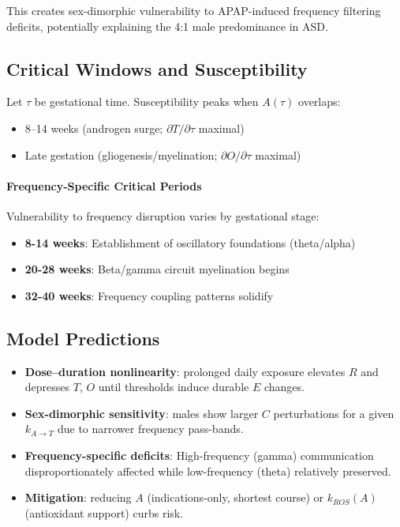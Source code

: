 \documentclass[12pt]{article}
\begin{document}
This creates sex-dimorphic vulnerability to APAP-induced frequency filtering deficits, potentially explaining the 4:1 male predominance in ASD.

\subsection{Critical Windows and Susceptibility}
Let $\tau$ be gestational time. Susceptibility peaks when $A(\tau)$ overlaps:
\begin{itemize}
\item 8--14 weeks (androgen surge; $\partial T/\partial \tau$ maximal)
\item Late gestation (gliogenesis/myelination; $\partial O/\partial \tau$ maximal)
\end{itemize}

\paragraph{Frequency-Specific Critical Periods}
Vulnerability to frequency disruption varies by gestational stage:
\begin{itemize}
\item \textbf{8-14 weeks}: Establishment of oscillatory foundations (theta/alpha)
\item \textbf{20-28 weeks}: Beta/gamma circuit myelination begins
\item \textbf{32-40 weeks}: Frequency coupling patterns solidify
\end{itemize}

\subsection{Model Predictions}
\begin{itemize}
\item \textbf{Dose--duration nonlinearity}: prolonged daily exposure elevates $R$ and depresses $T$, $O$ until thresholds induce durable $E$ changes.
\item \textbf{Sex-dimorphic sensitivity}: males show larger $C$ perturbations for a given $k_{A \rightarrow T}$ due to narrower frequency pass-bands.
\item \textbf{Frequency-specific deficits}: High-frequency (gamma) communication disproportionately affected while low-frequency (theta) relatively preserved.
\item \textbf{Mitigation}: reducing $A$ (indications-only, shortest course) or $k_{ROS}(A)$ (antioxidant support) curbs risk.
\end{itemize}
\end{document}
